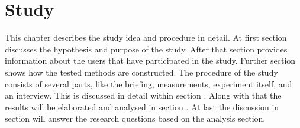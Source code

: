 \chapter{Study}
This chapter describes the study idea and procedure in detail. At first section  discusses the hypothesis and purpose of the study. After that section  provides information about the users that have participated in the study. Further section  shows how the tested methods are constructed. The procedure of the study consists of several parts, like the briefing, measurements, experiment itself, and an interview. This is discussed in detail within section . Along with that the results will be elaborated and analysed in section . At last the discussion in section  will answer the research questions based on the analysis section.






